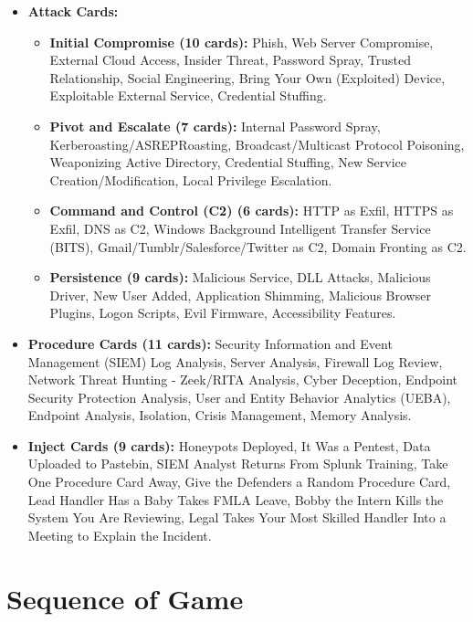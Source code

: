 \documentclass[letterpaper]{article} %
\begin{document}
\begin{itemize}
    \item \textbf{Attack Cards:}
    \begin{itemize}
        \item \textbf{Initial Compromise (10 cards):} Phish, Web Server Compromise, External Cloud Access, Insider Threat, Password Spray, Trusted Relationship, Social Engineering, Bring Your Own (Exploited) Device, Exploitable External Service, Credential Stuffing.

        \item \textbf{Pivot and Escalate (7 cards):} Internal Password Spray, Kerberoasting/ASREPRoasting, Broadcast/Multicast Protocol Poisoning, Weaponizing Active Directory, Credential Stuffing, New Service Creation/Modification, Local Privilege Escalation.

        \item \textbf{Command and Control (C2) (6 cards):} HTTP as Exfil, HTTPS as Exfil, DNS as C2, Windows Background Intelligent Transfer Service (BITS), Gmail/Tumblr/Salesforce/Twitter as C2, Domain Fronting as C2.

        \item \textbf{Persistence (9 cards):} Malicious Service, DLL Attacks, Malicious Driver, New User Added, Application Shimming, Malicious Browser Plugins, Logon Scripts, Evil Firmware, Accessibility Features.
    \end{itemize}

    \item \textbf{Procedure Cards (11 cards):} Security Information and Event Management (SIEM) Log Analysis, Server Analysis, Firewall Log Review, Network Threat Hunting - Zeek/RITA Analysis, Cyber Deception, Endpoint Security Protection Analysis, User and Entity Behavior Analytics (UEBA), Endpoint Analysis, Isolation, Crisis Management, Memory Analysis.

    \item \textbf{Inject Cards (9 cards):} Honeypots Deployed, It Was a Pentest, Data Uploaded to Pastebin, SIEM Analyst Returns From Splunk Training, Take One Procedure Card Away, Give the Defenders a Random Procedure Card, Lead Handler Has a Baby Takes FMLA Leave, Bobby the Intern Kills the System You Are Reviewing, Legal Takes Your Most Skilled Handler Into a Meeting to Explain the Incident.
\end{itemize}

\section{Sequence of Game}
\label{sec:sequence-of-game}
\end{document}
